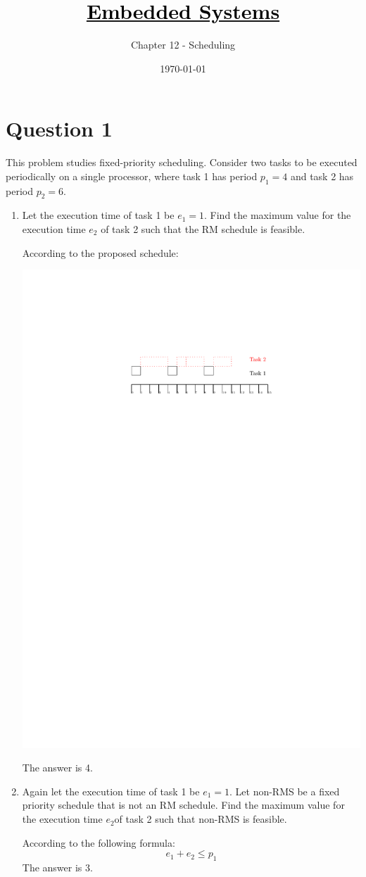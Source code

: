\documentclass[12pt]{article}
\title{\href{https://github.com/M-Sc-AUT/M.Sc-Computer-Architecture/tree/main/Embedded Systems Modeling and Design}{\textcolor{black}{Embedded Systems}}}
\subtitle{Chapter 12 - Scheduling}
\date{\today}
\begin{document}
\maketitlepage
\maketitlestart








\section{Question 1}
This problem studies fixed-priority scheduling. Consider two tasks to be executed
periodically on a single processor, where task 1 has period $p_1 = 4$ and task 2 has
period $p_2 = 6$.

\begin{enumerate}
	\item 
	Let the execution time of task 1 be $e_1 = 1$. Find the maximum value for the
	execution time $e_2$ of task 2 such that the RM schedule is feasible.
	\begin{qsolve}
		According to the proposed schedule:
		\begin{center}
			\includegraphics*[width=0.7\linewidth]{images/Q1/a.pdf}
		\end{center}
		The answer is 4.
	\end{qsolve}
	
	
	
	
	\item 
	Again let the execution time of task 1 be $e_1 = 1$. Let non-RMS be a fixed
	priority schedule that is not an RM schedule. Find the maximum value for the
	execution time $e_2$of task 2 such that non-RMS is feasible.
	\begin{qsolve}
		According to the following formula:
		$$ e_1+e_2\le p_1 $$
		The answer is 3.
	\end{qsolve}
	

\end{enumerate}
\end{document}
